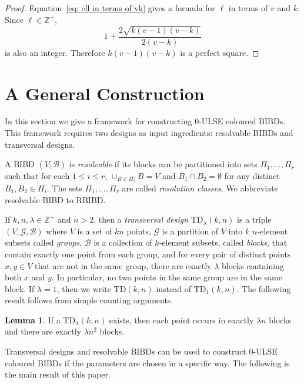 \documentclass[12pt]{article}
\theoremstyle{definition}
\newtheorem{lemma}[theorem]{Lemma}
\begin{document}
\begin{proof}
    Equation~\eqref{eq: ell in terms of vk} gives a formula for $\ell$ in terms of $v$ and $k$. Since $\ell\in \mathbb{Z}^+$, \[1 + \frac{2\sqrt{k(v-1)(v-k)}}{2(v-k)}\] is also an integer. Therefore $k(v-1)(v-k)$ is a perfect square.
\end{proof}



\section{A General Construction}\label{sec: Construction}

In this section we give a framework for constructing $0$-ULSE coloured BIBDs. This framework requires two designs as input ingredients: resolvable BIBDs and transversal designs.

A BIBD $(V, \mathcal{B})$ is \emph{resolvable} if its blocks can be partitioned into sets $\Pi_1, \dots, \Pi_r$ such that for each $1\leq i\leq r$, $\cup_{B \in \Pi_i} B = V$ and $B_1 \cap B_2 = \emptyset$ for any distinct $B_1, B_2 \in \Pi_i$. The sets $\Pi_1, \dots, \Pi_r$ are called \emph{resolution classes}. We abbreviate resolvable BIBD to RBIBD.

If $k,n,\lambda \in \mathbb{Z}^+$ and $n > 2$, then a \emph{transversal design} TD$_\lambda(k,n)$ is a triple $(V, \mathcal{G}, \mathcal{B})$ where $V$ is a set of $kn$ points, $\mathcal{G}$ is a partition of $V$ into $k$ $n$-element subsets called \emph{groups}, $\mathcal{B}$ is a collection of $k$-element subsets, called \emph{blocks}, that contain exactly one point from each group, and for every pair of distinct points $x,y \in V$ that are not in the same group, there are exactly $\lambda$ blocks containing both $x$ and $y$. In particular, no two points in the same group are in the same block. If $\lambda = 1$, then we write TD$(k,n)$ instead of TD$_1(k,n)$. The following result follows from simple counting arguments.

\begin{lemma}\label{lem: r and b for TDs}
    If a TD$_\lambda (k,n)$ exists, then each point occurs in exactly $\lambda n$ blocks and there are exactly $\lambda n^2$ blocks.
\end{lemma}

Transversal designs and resolvable BIBDs can be used to construct $0$-ULSE coloured BIBDs if the parameters are chosen in a specific way. The following is the main result of this paper.
\end{document}
